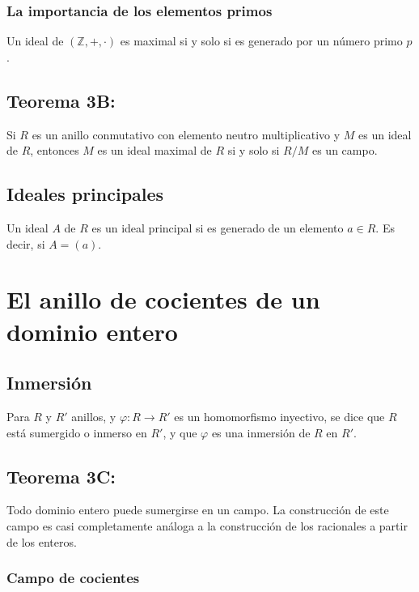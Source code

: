 \documentclass{article}
\begin{document}
\subsubsection*{\color{teal} La importancia de los elementos primos}

Un ideal de $(\mathbb{Z},+,\cdot)$ es maximal si y solo si es generado por un número primo $p$.

\subsection*{\color{red} Teorema 3B:}

Si $R$ es un anillo conmutativo con elemento neutro multiplicativo y $M$ es un ideal de $R$, entonces $M$ es un ideal maximal de $R$ si y solo si $R/M$ es un campo.

\subsection*{\color{violet} Ideales principales}

Un ideal $A$ de $R$ es un ideal principal si es generado de un elemento $a\in R$. Es decir, si $A=(a)$.

\newpage
\section{El anillo de cocientes de un dominio entero}

\subsection*{\color{violet} Inmersión}

Para $R$ y $R'$ anillos, y $\varphi:R\to R'$ es un homomorfismo inyectivo, se dice que $R$ está sumergido o inmerso en $R'$, y que $\varphi$ es una inmersión de $R$ en $R'$. 

\subsection*{\color{red} Teorema 3C:}

Todo dominio entero puede sumergirse en un campo. La construcción de este campo es casi completamente análoga a la construcción de los racionales a partir de los enteros.

\subsubsection*{\color{teal} Campo de cocientes}
\end{document}
